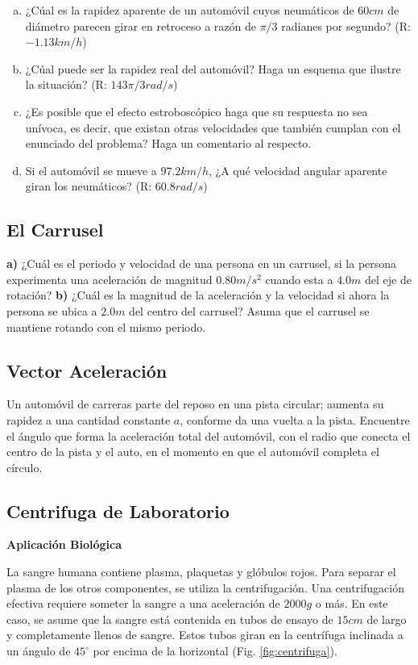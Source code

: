 \documentclass{replab}
\begin{document}
	\begin{enumerate}[a)]
		\item ¿Cúal es la rapidez aparente de un automóvil cuyos neumáticos de $60cm$ de diámetro parecen girar en retroceso a razón de $\pi/3$ radianes por segundo? (R: $-1.13km/h$)
		\item ¿Cúal puede ser la rapidez real del automóvil? Haga un esquema que ilustre la situación? (R: $143\pi/3 rad/s$)
		\item ¿Es posible que el efecto estroboscópico haga que su respuesta no sea unívoca, es decir, que existan otras velocidades que también cumplan con el enunciado del problema? Haga un comentario al respecto.
		\item Si el automóvil se mueve a $97.2km/h$, ¿A qué velocidad angular aparente giran los neumáticos? (R: $60.8rad/s$)
	\end{enumerate}

\subsection{El Carrusel}
\textbf{a)} ¿Cuál es el periodo y velocidad de una persona en un carrusel, si la persona experimenta una aceleración de magnitud $0.80m/s^2$ cuando esta a $4.0m$ del eje de rotación? \textbf{b)} ¿Cuál es la magnitud de la aceleración y la velocidad si ahora la persona se ubica a $2.0m$ del centro del carrusel? Asuma que el carrusel se mantiene rotando con el mismo periodo.

\subsection{Vector Aceleración}
Un automóvil de carreras parte del reposo en una pista circular; aumenta su rapidez a una cantidad constante $a$, conforme da una vuelta a la pista. Encuentre el ángulo que forma la aceleración total del automóvil, con el radio que conecta el centro de la pista y el auto, en el momento en que el automóvil completa el círculo.

\subsection{Centrifuga de Laboratorio}
\textbf{Aplicación Biológica} 

La sangre humana contiene plasma, plaquetas y glóbulos rojos. Para separar el plasma de los otros componentes, se utiliza la centrifugación. Una centrifugación efectiva requiere someter la sangre a una aceleración de $2000g$ o más. En este caso, se asume que la sangre está contenida en tubos de ensayo de $15cm$ de largo y completamente llenos de sangre. Estos tubos giran en la centrífuga inclinada a un ángulo de $45^\circ$ por encima de la horizontal (Fig. \ref{fig:centrifuga}).
\end{document}
